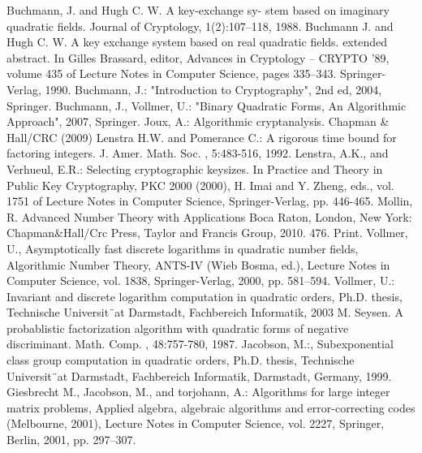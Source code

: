 \documentclass[12pt, letterpaper]{report}
\begin{document}
\begin{thebibliography}{9}
 Buchmann, J. and Hugh C. W. A key-exchange sy-
stem based on imaginary quadratic fields. Journal of Cryptology,
1(2):107–118, 1988.
 Buchmann J. and Hugh C. W. A key exchange
system based on real quadratic fields. extended abstract. In Gilles
Brassard, editor, Advances in Cryptology – CRYPTO ’89, volume
435 of Lecture Notes in Computer Science, pages 335–343. Springer-Verlag, 1990.
 Buchmann, J.: "Introduction to Cryptography", 2nd ed, 2004, Springer.
 Buchmann, J., Vollmer, U.: "Binary Quadratic Forms, An Algorithmic Approach", 2007, Springer.
 Joux, A.: Algorithmic cryptanalysis. Chapman \& Hall/CRC (2009)
 Lenstra H.W. and Pomerance C.:  A rigorous time bound for factoring
integers. J. Amer. Math. Soc. , 5:483-516, 1992.
 Lenstra, A.K., and Verhueul, E.R.: Selecting cryptographic keysizes. In Practice and Theory in Public Key Cryptography, PKC 2000 (2000), 
H. Imai and Y. Zheng, eds., vol. 1751 of Lecture Notes in Computer Science, Springer-Verlag, pp. 446-465. 
 Mollin, R. Advanced Number Theory with Applications Boca Raton, London, New York: Chapman\&Hall/Crc Press, Taylor and Francis Group, 2010. 476. Print. 
 Vollmer, U., Asymptotically fast discrete logarithms in quadratic number fields, Algorithmic Number Theory, ANTS-IV (Wieb Bosma, ed.), 
Lecture Notes in Computer Science, vol. 1838, Springer-Verlag, 2000, pp. 581–594.
 Vollmer, U.: Invariant and discrete logarithm computation in quadratic orders,
Ph.D. thesis, Technische Universit¨at Darmstadt, Fachbereich Informatik, 2003
 M. Seysen. A probablistic factorization algorithm with quadratic forms of
negative discriminant. Math. Comp. , 48:757-780, 1987.
 Jacobson, M.:, Subexponential class group computation in quadratic orders,
Ph.D. thesis, Technische Universit¨at Darmstadt, Fachbereich Informatik,
Darmstadt, Germany, 1999.
 Giesbrecht M., Jacobson, M., and torjohann, A.: Algorithms
for large integer matrix problems, Applied algebra, algebraic algorithms
and error-correcting codes (Melbourne, 2001), Lecture Notes
in Computer Science, vol. 2227, Springer, Berlin, 2001, pp. 297–307.
\end{thebibliography}
\end{document}
